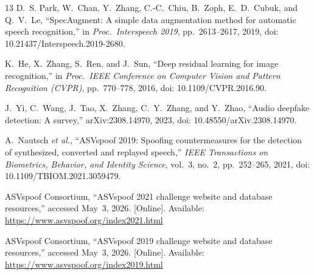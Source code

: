 \documentclass[11pt, letterpaper]{article}
\begin{document}
\begin{thebibliography}{13}
D.~S. Park, W.~Chan, Y.~Zhang, C.-C.~Chiu, B.~Zoph, E.~D.~Cubuk, and Q.~V.~Le, ``SpecAugment: A simple data augmentation method for automatic speech recognition,'' in \emph{Proc.\ Interspeech 2019}, pp.~2613--2617, 2019, doi: 10.21437/Interspeech.2019-2680.

K.~He, X.~Zhang, S.~Ren, and J.~Sun, ``Deep residual learning for image recognition,'' in \emph{Proc.\ IEEE Conference on Computer Vision and Pattern Recognition (CVPR)}, pp.~770--778, 2016, doi: 10.1109/CVPR.2016.90.

J.~Yi, C.~Wang, J.~Tao, X.~Zhang, C.~Y.~Zhang, and Y.~Zhao, ``Audio deepfake detection: A survey,'' arXiv:2308.14970, 2023, doi: 10.48550/arXiv.2308.14970.

A.~Nautsch \emph{et al.}, ``ASVspoof 2019: Spoofing countermeasures for the detection of synthesized, converted and replayed speech,'' \emph{IEEE Transactions on Biometrics, Behavior, and Identity Science}, vol.~3, no.~2, pp.~252--265, 2021, doi: 10.1109/TBIOM.2021.3059479.

ASVspoof Consortium, ``ASVspoof 2021 challenge website and database resources,'' accessed May~3, 2026. [Online]. Available: \url{https://www.asvspoof.org/index2021.html}

ASVspoof Consortium, ``ASVspoof 2019 challenge website and database resources,'' accessed May~3, 2026. [Online]. Available: \url{https://www.asvspoof.org/index2019.html}

\end{thebibliography}
\end{document}
